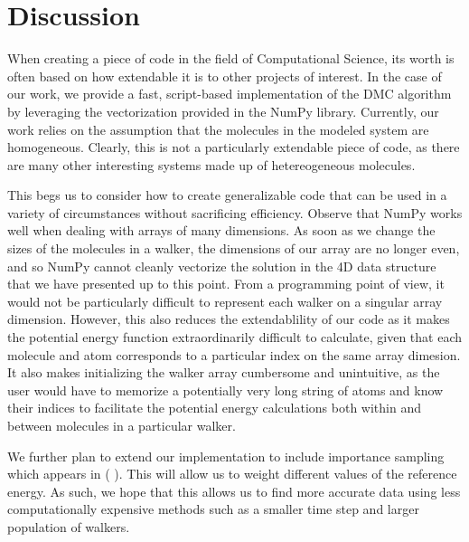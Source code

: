 \documentclass[journal=jacsat,manuscript=article]{achemso}
\begin{document}
\section{Discussion}
When creating a piece of code in the field of Computational Science, its worth is often based on how extendable it is to other projects of interest. In the case of our work, we provide a fast, script-based implementation of the DMC algorithm by leveraging the vectorization provided in the NumPy library. Currently, our work relies on the assumption that the molecules in the modeled system are homogeneous. Clearly, this is not a particularly extendable piece of code, as there are many other interesting systems made up of hetereogeneous molecules. 

This begs us to consider how to create generalizable code that can be used in a variety of circumstances without sacrificing efficiency. Observe that NumPy works well when dealing with arrays of many dimensions. As soon as we change the sizes of the molecules in a walker, the dimensions of our array are no longer even, and so NumPy cannot cleanly vectorize the solution in the 4D data structure that we have presented up to this point. From a programming point of view, it would not be particularly difficult to represent each walker on a singular array dimension. However, this also reduces the extendablility of our code as it makes the potential energy function extraordinarily difficult to calculate, given that each molecule and atom corresponds to a particular index on the same array dimesion. It also makes initializing the walker array cumbersome and unintuitive, as the user would have to memorize a potentially very long string of atoms and know their indices to facilitate the potential energy calculations both within and between molecules in a particular walker. 

We further plan to extend our implementation to include importance sampling which appears in ( ). This will allow us to weight different values of the reference energy. As such, we hope that this allows us to find more accurate data using less computationally expensive methods such as a smaller time step and larger population of walkers. 
\end{document}
